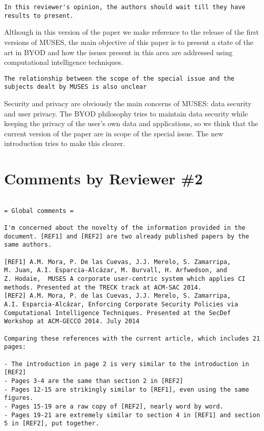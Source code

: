 \documentclass[preprint]{elsarticle}
\begin{document}
{\begin{verbatim}
In this reviewer's opinion, the authors should wait till they have
results to present. 
\end{verbatim}

Although in this version of the paper we make reference to the release
of the first versions of MUSES, the main objective  of this paper is
to present a state of the art in BYOD and how the issues present in
this area are addressed using computational intelligence techniques.

\begin{verbatim}
The relationship between the scope of the special issue and the
subjects dealt by MUSES is also unclear
\end{verbatim}

Security and privacy are obviously the main concerns of MUSES: data
security and user privacy. The BYOD philosophy tries to maintain data
security while keeping the privacy of the user's own data and
applications, so we think that the current version of the paper are in
scope of the special issue. The new introduction tries to make this
clearer. 


\section{Comments by Reviewer \#2}

\begin{verbatim}

= Global comments =

I'm concerned about the novelty of the information provided in the
document. [REF1] and [REF2] are two already published papers by the
same authors. 

[REF1] A.M. Mora, P. De las Cuevas, J.J. Merelo, S. Zamarripa,
M. Juan, A.I. Esparcia-Alcázar, M. Burvall, H. Arfwedson, and
Z. Hodaie,  MUSES A corporate user-centric system which applies CI
methods. Presented at the TRECK track at ACM-SAC 2014. 
[REF2] A.M. Mora, P. de las Cuevas, J.J. Merelo, S. Zamarripa,
A.I. Esparcia-Alcázar, Enforcing Corporate Security Policies via
Computational Intelligence Techniques. Presented at the SecDef
Workshop at ACM-GECCO 2014. July 2014 

Comparing these references with the current article, which includes 21 pages:

- The introduction in page 2 is very similar to the introduction in [REF2]
- Pages 3-4 are the same than section 2 in [REF2]
- Pages 12-15 are strikingly similar to [REF1], even using the same figures.
- Pages 15-19 are a raw copy of [REF2], nearly word by word.
- Pages 19-21 are extremely similar to section 4 in [REF1] and section 5 in [REF2], put together.


\end{verbatim}}
\end{document}
